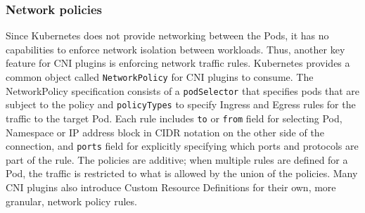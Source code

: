 \documentclass[english,12pt,a4paper,pdftex,sci,utf8]{aaltothesis}
\begin{document}


\subsubsection{Network policies}

Since Kubernetes does not provide networking between the Pods, it has no capabilities to enforce network isolation between workloads. Thus, another key feature for CNI plugins is enforcing network traffic rules. Kubernetes provides a common object called \texttt{NetworkPolicy} for CNI plugins to consume. The NetworkPolicy specification consists of a \texttt{podSelector} that specifies pods that are subject to the policy and \texttt{policyTypes} to specify Ingress and Egress rules for the traffic \cite{budigiri2021network} to the target Pod. Each rule includes \texttt{to} or \texttt{from} field for selecting Pod, Namespace or IP address block in CIDR notation on the other side of the connection, and \texttt{ports} field for explicitly specifying which ports and protocols are part of the rule. The policies are additive; when multiple rules are defined for a Pod, the traffic is restricted to what is allowed by the union of the policies. Many CNI plugins also introduce Custom Resource Definitions for their own, more granular, network policy rules.
\end{document}

